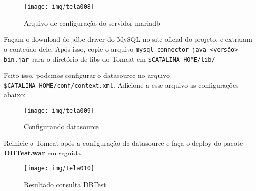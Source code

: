 \begin{figure}[H]
	\centering
	\caption[50-server.cnf]{Arquivo de configuração do servidor mariadb}
	\texttt{[image: img/tela008]}
	\label{fig:server.cnf}
\end{figure}

Façam o download do jdbc driver do MySQL no site oficial do projeto, e extraiam o conteúdo dele. Após isso, copie o arquivo {\small \texttt{mysql-connector-java-<versão>-bin.jar}} para o diretório de libs do Tomcat em {\small \texttt{\$CATALINA\_HOME/lib/}}

Feito isso, podemos configurar o datasource no arquivo {\small \texttt{\$CATALINA\_HOME/conf/context.xml}}.
Adicione a esse arquivo as configurações abaixo:

\begin{figure}[H]
	\centering
	\caption[context.xml]{Configurando datasource}
	\texttt{[image: img/tela009]}
	\label{fig:context.xml}
\end{figure}
Reinicie o Tomcat após a configuração do datasource e faça o deploy do pacote \textbf{DBTest.war} em seguida.
\begin{figure}[H]
	\centering
	\caption[DBTest - Browser]{Resultado consulta DBTest}
	\texttt{[image: img/tela010]}
	\label{fig:DBTesteWAR}
\end{figure}

